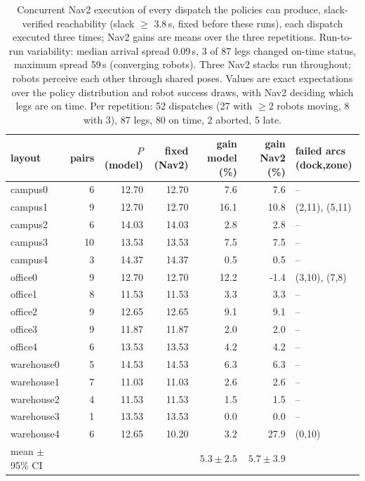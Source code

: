 \begin{table}[h]\centering\caption{Concurrent Nav2 execution of every dispatch the policies can produce, slack-verified reachability (slack $\ge$ 3.8\,s, fixed before these runs), each dispatch executed three times; Nav2 gains are means over the three repetitions. Run-to-run variability: median arrival spread 0.09\,s, 3 of 87 legs changed on-time status, maximum spread 59\,s (converging robots). Three Nav2 stacks run throughout; robots perceive each other through shared poses. Values are exact expectations over the policy distribution and robot success draws, with Nav2 deciding which legs are on time. Per repetition: 52 dispatches (27 with $\ge$2 robots moving, 8 with 3), 87 legs, 80 on time, 2 aborted, 5 late.}\label{tab:s-exact-verified_all}\scriptsize
\begin{tabular}{@{}lrrrrrl@{}}\toprule layout & pairs & $P$ (model) & fixed (Nav2) & gain model (\%) & gain Nav2 (\%) & failed arcs (dock,zone)\\\midrule
campus0 & 6 & 12.70 & 12.70 & 7.6 & 7.6 & --\\
campus1 & 9 & 12.70 & 12.70 & 16.1 & 10.8 & (2,11), (5,11)\\
campus2 & 6 & 14.03 & 14.03 & 2.8 & 2.8 & --\\
campus3 & 10 & 13.53 & 13.53 & 7.5 & 7.5 & --\\
campus4 & 3 & 14.37 & 14.37 & 0.5 & 0.5 & --\\
office0 & 9 & 12.70 & 12.70 & 12.2 & -1.4 & (3,10), (7,8)\\
office1 & 8 & 11.53 & 11.53 & 3.3 & 3.3 & --\\
office2 & 9 & 12.65 & 12.65 & 9.1 & 9.1 & --\\
office3 & 9 & 11.87 & 11.87 & 2.0 & 2.0 & --\\
office4 & 6 & 13.53 & 13.53 & 4.2 & 4.2 & --\\
warehouse0 & 5 & 14.53 & 14.53 & 6.3 & 6.3 & --\\
warehouse1 & 7 & 11.03 & 11.03 & 2.6 & 2.6 & --\\
warehouse2 & 4 & 11.53 & 11.53 & 1.5 & 1.5 & --\\
warehouse3 & 1 & 13.53 & 13.53 & 0.0 & 0.0 & --\\
warehouse4 & 6 & 12.65 & 10.20 & 3.2 & 27.9 & (0,10)\\
\midrule mean $\pm$ 95\% CI & & & & $5.3\pm2.5$ & $5.7\pm3.9$ & \\
\bottomrule\end{tabular}\end{table}
